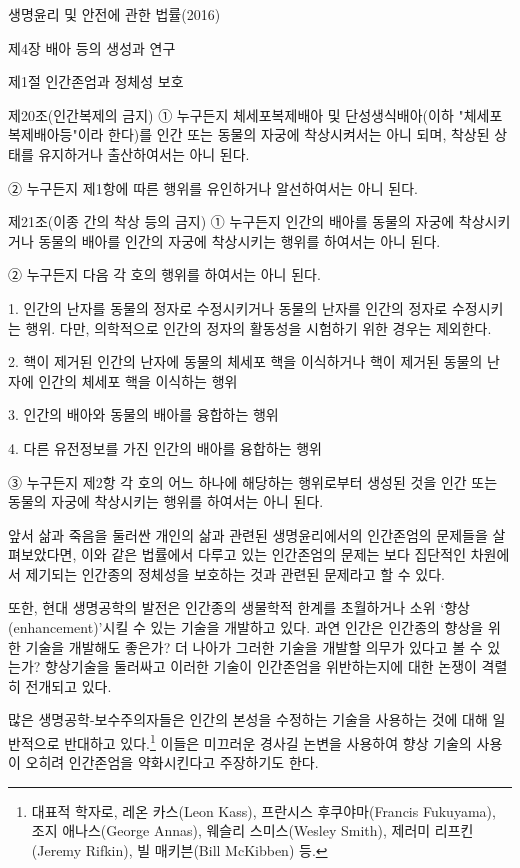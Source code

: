 생명윤리 및 안전에 관한 법률(2016)

제4장 배아 등의 생성과 연구

제1절 인간존엄과 정체성 보호

제20조(인간복제의 금지) ① 누구든지 체세포복제배아 및 단성생식배아(이하 "체세포복제배아등"이라 한다)를 인간 또는 동물의 자궁에 착상시켜서는 아니 되며, 착상된 상태를 유지하거나 출산하여서는 아니 된다.

② 누구든지 제1항에 따른 행위를 유인하거나 알선하여서는 아니 된다.

제21조(이종 간의 착상 등의 금지) ① 누구든지 인간의 배아를 동물의 자궁에 착상시키거나 동물의 배아를 인간의 자궁에 착상시키는 행위를 하여서는 아니 된다.

② 누구든지 다음 각 호의 행위를 하여서는 아니 된다.

1. 인간의 난자를 동물의 정자로 수정시키거나 동물의 난자를 인간의 정자로 수정시키는 행위. 다만, 의학적으로 인간의 정자의 활동성을 시험하기 위한 경우는 제외한다.

2. 핵이 제거된 인간의 난자에 동물의 체세포 핵을 이식하거나 핵이 제거된 동물의 난자에 인간의 체세포 핵을 이식하는 행위

3. 인간의 배아와 동물의 배아를 융합하는 행위

4. 다른 유전정보를 가진 인간의 배아를 융합하는 행위

③ 누구든지 제2항 각 호의 어느 하나에 해당하는 행위로부터 생성된 것을 인간 또는 동물의 자궁에 착상시키는 행위를 하여서는 아니 된다.

앞서 삶과 죽음을 둘러싼 개인의 삶과 관련된 생명윤리에서의 인간존엄의 문제들을 살펴보았다면, 이와 같은 법률에서 다루고 있는 인간존엄의 문제는 보다 집단적인 차원에서 제기되는 인간종의 정체성을 보호하는 것과 관련된 문제라고 할 수 있다.

또한, 현대 생명공학의 발전은 인간종의 생물학적 한계를 초월하거나 소위 `향상(enhancement)'시킬 수 있는 기술을 개발하고 있다. 과연 인간은 인간종의 향상을 위한 기술을 개발해도 좋은가? 더 나아가 그러한 기술을 개발할 의무가 있다고 볼 수 있는가? 향상기술을 둘러싸고 이러한 기술이 인간존엄을 위반하는지에 대한 논쟁이 격렬히 전개되고 있다.

많은 생명공학-보수주의자들은 인간의 본성을 수정하는 기술을 사용하는 것에 대해 일반적으로 반대하고 있다.\footnote{대표적 학자로, 레온 카스(Leon Kass), 프란시스 후쿠야마(Francis Fukuyama), 조지 애나스(George Annas), 웨슬리 스미스(Wesley Smith), 제러미 리프킨(Jeremy Rifkin), 빌 매키븐(Bill McKibben) 등.} 이들은 미끄러운 경사길 논변을 사용하여 향상 기술의 사용이 오히려 인간존엄을 약화시킨다고 주장하기도 한다.

